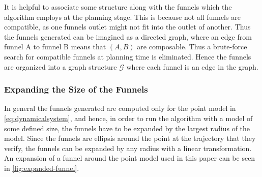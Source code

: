 It is helpful to associate some structure along with the funnels which the
\rrtfunnel{} algorithm employs at the planning stage. This is because not all
funnels are compatible, as one funnels outlet might not fit into the outlet of
another. Thus the funnels generated can be imagined as a directed graph, where
an edge from funnel A to funnel B means that \((A,B)\) are composable. Thus a
brute-force search for compatible funnels at planning time is eliminated. Hence
the funnels are organized into a graph structure \(\mathcal{G}\) where each
funnel is an edge in the graph.



\subsubsection{Expanding the Size of the Funnels}

In general the funnels generated are computed only for the point model in
\cref{eq:dynamicalsystem}, and hence, in order to run the algorithm with a
model of some defined size, the funnels have to be expanded by the largest
radius of the model. Since the funnels are ellipsis around the point at the
trajectory that they verify, the funnels can be expanded by any radius with a
linear transformation. An expansion of a funnel around the point model used in
this paper can be seen in \cref{fig:expanded-funnel}.

